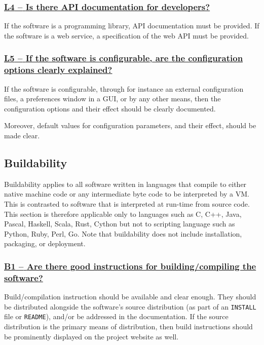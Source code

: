 \documentclass[a4paper,11pt]{article}
\newcommand{\criterion}[1]{\subsubsection*{\underline{#1}}}
\begin{document}
\newcommand{\lFourID}{L4}
\newcommand{\lFourText}{Is there API documentation for developers?}
\criterion{\lFourID{ }--{ }\lFourText}\label{id:l4} 

If the software is a programming library, API documentation must be provided.
If the software is a web service, a specification of the web API must be provided.

\newcommand{\lFiveID}{L5}
\newcommand{\lFiveText}{If the software is configurable, are the configuration options clearly explained?}
\criterion{\lFiveID{ }--{ }\lFiveText}\label{id:l5} 

%
%

If the software is configurable, through for instance an external configuration
files, a preferences window in a GUI, or by any other means, then the
configuration options and their effect should be clearly documented.

Moreover, default values for configuration parameters, and their effect, should be
made clear.

\subsection{Buildability}\label{sec:bui}

Buildability applies to all software written in languages that compile to
either native machine code or any intermediate byte code to be interpreted by a VM.
This is contrasted to software that is interpreted at run-time from source
code. This section is therefore applicable only to languages such as C, C++,
Java, Pascal, Haskell, Scala, Rust, Cython but not to scripting language such
as Python, Ruby, Perl, Go.  Note that buildability does not include
installation, packaging, or deployment.

\newcommand{\bOneID}{B1}
\newcommand{\bOneText}{Are there good instructions for building/compiling the software?}
\criterion{\bOneID{ }--{ }\bOneText}\label{id:b1} 

Build/compilation instruction should be available and clear enough. They should
be distributed alongside the software's source distribution (as part of an
\texttt{INSTALL} file or \texttt{README}), and/or be addressed in the documentation. If the
source distribution is the primary means of distribution, then build
instructions should be prominently displayed on the project website as well.
\end{document}
